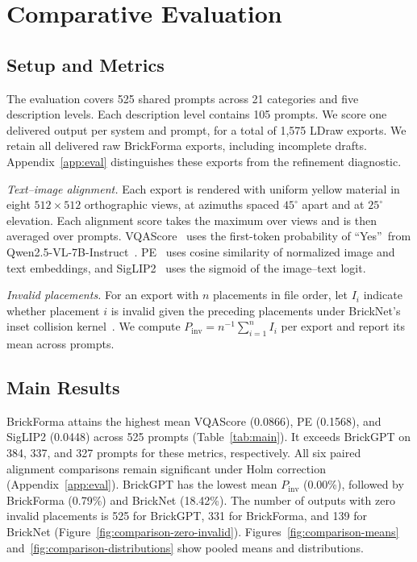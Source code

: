 \documentclass[letterpaper]{article} %
\begin{document}
\section{Comparative Evaluation}
\label{sec:eval}
\subsection{Setup and Metrics}
\label{sec:setup}
The evaluation covers 525 shared prompts across 21 categories and five description levels. Each description level contains 105 prompts. We score one delivered output per system and prompt, for a total of 1,575 LDraw exports. We retain all delivered raw BrickForma exports, including incomplete drafts. Appendix~\ref{app:eval} distinguishes these exports from the refinement diagnostic.


\emph{Text--image alignment.}
Each export is rendered with uniform yellow material in eight $512{\times}512$ orthographic views, at azimuths spaced $45^\circ$ apart and at $25^\circ$ elevation. Each alignment score takes the maximum over views and is then averaged over prompts. VQAScore~\cite{vqascore} uses the first-token probability of \textquotedblleft Yes\textquotedblright\ from Qwen2.5-VL-7B-Instruct~\cite{qwen25vl}. PE~\cite{pe} uses cosine similarity of normalized image and text embeddings, and SigLIP2~\cite{siglip2} uses the sigmoid of the image--text logit.

\emph{Invalid placements.}
For an export with $n$ placements in file order, let $I_i$ indicate whether placement $i$ is invalid given the preceding placements under BrickNet's inset collision kernel~\cite{bricknet}. We compute $P_{\mathrm{inv}}=n^{-1}\sum_{i=1}^{n}I_i$ per export and report its mean across prompts.

\subsection{Main Results}

BrickForma attains the highest mean VQAScore (0.0866), PE (0.1568), and SigLIP2 (0.0448) across 525 prompts (Table~\ref{tab:main}). It exceeds BrickGPT on 384, 337, and 327 prompts for these metrics, respectively. All six paired alignment comparisons remain significant under Holm correction (Appendix~\ref{app:eval}). BrickGPT has the lowest mean $P_{\mathrm{inv}}$ (0.00\%), followed by BrickForma (0.79\%) and BrickNet (18.42\%). The number of outputs with zero invalid placements is 525 for BrickGPT, 331 for BrickForma, and 139 for BrickNet (Figure~\ref{fig:comparison-zero-invalid}). Figures~\ref{fig:comparison-means} and~\ref{fig:comparison-distributions} show pooled means and distributions.
\end{document}

